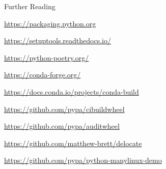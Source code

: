 \begin{frame}[c]{Further Reading}
  \begin{description}
    \item[PyPA User Guide] \url{https://packaging.python.org}
    \item[setuptools docs] \url{https://setuptools.readthedocs.io/}
    \item[poetry] \url{https://python-poetry.org/}

    \medskip
    \item[conda-forge] \url{https://conda-forge.org/}
    \item[conda build docs] \url{https://docs.conda.io/projects/conda-build}

    \medskip
    \item[cibuildwheel] \url{https://github.com/pypa/cibuildwheel}
    \item[auditwheel] \url{https://github.com/pypa/auditwheel}
    \item[delocate] \url{https://github.com/matthew-brett/delocate}
    \item[manylinux demo] \url{https://github.com/pypa/python-manylinux-demo}
  \end{description}
\end{frame}


